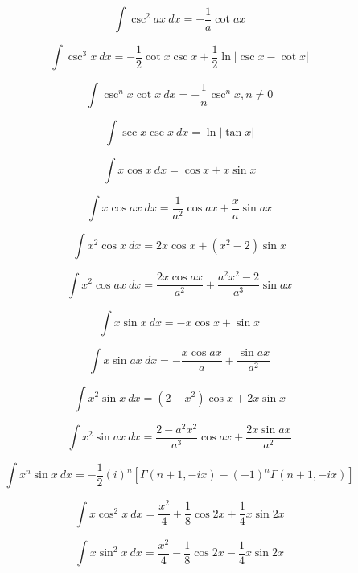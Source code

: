 \begin{equation*}
\int \csc^2 ax\ dx = -\frac{1}{a} \cot ax 
\end{equation*}

\begin{equation*}
\int \csc^3 x\ dx = -\frac{1}{2}\cot x \csc x + \frac{1}{2} \ln | \csc x - \cot x | 
\end{equation*}

\begin{equation*}
\int \csc^nx \cot x\ dx = -\frac{1}{n}\csc^n x, n\ne 0
\end{equation*}

\begin{equation*}
\int \sec x \csc x \ dx = \ln | \tan x | 
\end{equation*}

\begin{equation*}
\int x \cos x \ dx = \cos x + x \sin x 
\end{equation*}

\begin{equation*}
\int x \cos ax \ dx = \frac{1}{a^2} \cos ax + \frac{x}{a} \sin ax 
\end{equation*}

\begin{equation*}
\int x^2 \cos x \ dx = 2 x \cos x + \left ( x^2 - 2 \right ) \sin x 
\end{equation*}

\begin{equation*}
\int x^2 \cos ax \ dx = \frac{2 x \cos ax }{a^2} + \frac{ a^2 x^2 - 2  }{a^3} \sin ax 
\end{equation*}

\begin{equation*}
\int x \sin x\ dx = -x \cos x + \sin x 
\end{equation*}

\begin{equation*}
\int x \sin ax\ dx = -\frac{x \cos ax}{a} + \frac{\sin ax}{a^2} 
\end{equation*}

\begin{equation*}
\int x^2 \sin x\ dx = \left(2-x^2\right) \cos x + 2 x \sin x
\end{equation*}

\begin{equation*}
\int x^2 \sin ax\ dx =\frac{2-a^2x^2}{a^3}\cos ax +\frac{ 2 x \sin ax}{a^2} 
\end{equation*}

\begin{equation*}\label{eq:xul}
\int x^n \sin x \ dx = -\frac{1}{2}(i)^n\left[ \Gamma(n+1, -ix) 
- (-1)^n\Gamma(n+1, -ix)\right] 
\end{equation*}

\begin{equation*}
\int x \cos^2 x \ dx = \frac{x^2}{4}+\frac{1}{8}\cos 2x + \frac{1}{4} x \sin 2x
\end{equation*}

\begin{equation*}
\int x \sin^2 x \ dx = \frac{x^2}{4}-\frac{1}{8}\cos 2x - \frac{1}{4} x \sin 2x
\end{equation*}